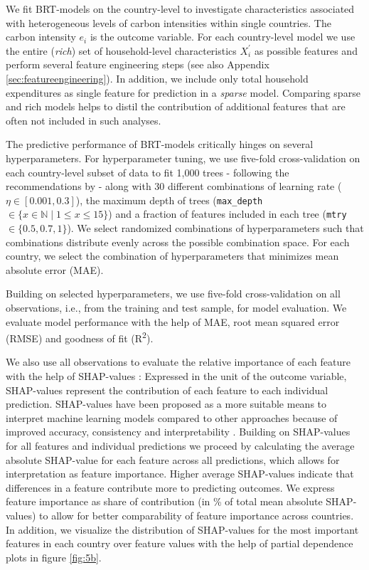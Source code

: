 \documentclass[12pt, a4paper]{article}
\begin{document}
We fit BRT-models on the country-level to investigate characteristics associated with heterogeneous levels of carbon intensities within single countries. The carbon intensity $e_{i}$ is the outcome variable. For each country-level model we use the entire (\textit{rich}) set of household-level characteristics $X_{i}^{'}$ as possible features and perform several feature engineering steps (see also Appendix \ref{sec:featureengineering}). In addition, we include only total household expenditures as single feature for prediction in a \textit{sparse} model. Comparing sparse and rich models helps to distil the contribution of additional features that are often not included in such analyses.

The predictive performance of BRT-models critically hinges on several hyperparameters. For hyperparameter tuning, we use five-fold cross-validation on each country-level subset of data to fit 1,000 trees - following the recommendations by \textcite{Elith.2008} - along with 30 different combinations of learning rate ($\eta \in [0.001,0.3]$), the maximum depth of trees (\texttt{max\_depth} $\in \{x \in \mathbb{N} \mid 1  \leq x \leq 15 \}$) and a fraction of features included in each tree (\texttt{mtry} $\in \{0.5,0.7,1\}$). We select randomized combinations of hyperparameters such that combinations distribute evenly across the possible combination space. For each country, we select the combination of hyperparameters that minimizes mean absolute error (MAE).

Building on selected hyperparameters, we use five-fold cross-validation on all observations, i.e., from the training and test sample, for model evaluation. We evaluate model performance with the help of MAE, root mean squared error (RMSE) and goodness of fit (R\textsuperscript{2}). 

We also use all observations to evaluate the relative importance of each feature with the help of SHAP-values \autocite{Lundberg.2017}: Expressed in the unit of the outcome variable, SHAP-values represent the contribution of each feature to each individual prediction. SHAP-values have been proposed as a more suitable means to interpret machine learning models compared to other approaches because of improved accuracy, consistency and interpretability \autocite{Lundberg.2020}. Building on SHAP-values for all features and individual predictions we proceed by calculating the average absolute SHAP-value for each feature across all predictions, which allows for interpretation as feature importance. Higher average SHAP-values indicate that differences in a feature contribute more to predicting outcomes. We express feature importance as share of contribution (in \% of total mean absolute SHAP-values) to allow for better comparability of feature importance across countries. In addition, we visualize the distribution of SHAP-values for the most important features in each country over feature values with the help of partial dependence plots in figure \ref{fig:5b}. 
\end{document}
